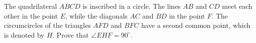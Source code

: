 The quadrilateral $ABCD$ is inscribed in a circle. The lines $AB$ and $CD$ meet each other in the point $E$, while the diagonals $AC$ and $BD$ in the point $F$. The circumcircles of the triangles $AFD$ and $BFC$ have a second common point, which is denoted by $H$. Prove that $\angle EHF=90^\circ$.